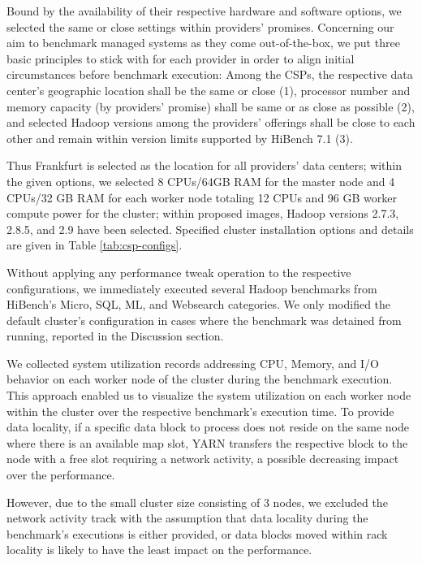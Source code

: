 \documentclass[review]{elsarticle}
\begin{document}
	Bound by the availability of their respective hardware and software options, we selected the same or close settings within providers' promises. Concerning our aim to benchmark managed systems as they come out-of-the-box, we put three basic principles to stick with for each provider in order to align initial circumstances before benchmark execution: Among the CSPs, the respective data center's geographic location shall be the same or close (1), processor number and memory capacity (by providers' promise) shall be same or as close as possible (2), and selected Hadoop versions among the providers' offerings shall be close to each other and remain within version limits supported by HiBench 7.1 (3). 
	
	Thus Frankfurt is selected as the location for all providers' data centers; within the given options, we selected 8 CPUs/64GB RAM for the master node and 4 CPUs/32 GB RAM for each worker node totaling 12 CPUs and 96 GB worker compute power for the cluster; within proposed images, Hadoop versions 2.7.3, 2.8.5, and 2.9 have been selected. Specified cluster installation options and details are given in Table \ref{tab:csp-configs}.
	
	Without applying any performance tweak operation to the respective configurations, we immediately executed several Hadoop benchmarks from HiBench's Micro, SQL, ML, and Websearch categories. We only modified the default cluster's configuration in cases where the benchmark was detained from running, reported in the Discussion section.
	
	We collected system utilization records addressing CPU, Memory, and I/O behavior on each worker node of the cluster during the benchmark execution. This approach enabled us to visualize the system utilization on each worker node within the cluster over the respective benchmark's execution time. To provide data locality, if a specific data block to process does not reside on the same node where there is an available map slot, YARN transfers the respective block to the node with a free slot requiring a network activity, a possible decreasing impact over the performance. 
	
	However, due to the small cluster size consisting of 3 nodes, we excluded the network activity track with the assumption that data locality during the benchmark's executions is either provided, or data blocks moved within rack locality is likely to have the least impact on the performance.
	
\end{document}
